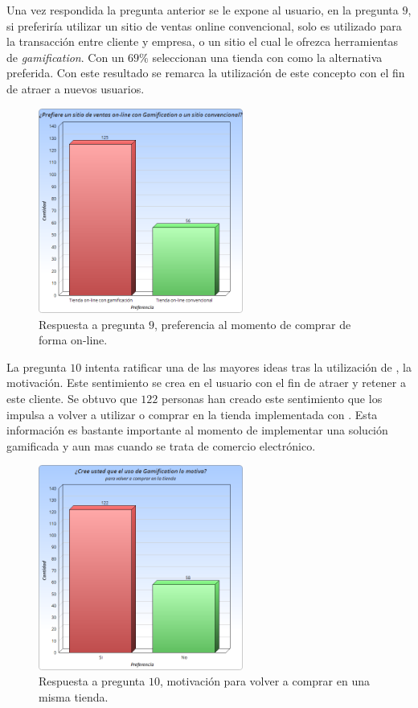 Una vez respondida la pregunta anterior se le expone al usuario, en la pregunta $9$, si preferiría
utilizar un sitio de ventas online convencional, solo es utilizado para la transacción entre cliente
y empresa, o un sitio el cual le ofrezca herramientas de \emph{gamification}. Con un $69\%$ seleccionan
una tienda con {\GAM} como la alternativa preferida. Con este resultado se remarca la
utilización de este concepto con el fin de atraer a nuevos usuarios.

\begin{figure}[!htb]
  \centering
  \includegraphics[width=0.6\textwidth]{images/Graficos/graf_5_10.png}
  \caption[chart5.10]{Respuesta a pregunta $9$, preferencia al momento de comprar de forma on-line.}
  \label{fig:chart5.10}
\end{figure}


La pregunta $10$ intenta ratificar una de las mayores ideas tras la utilización de {\GAM},
la motivación. Este sentimiento se crea en el usuario con el fin de atraer y retener a este cliente.
 Se obtuvo que $122$ personas han creado este sentimiento que los impulsa a volver a utilizar o comprar
en la tienda implementada con {\GAM}. Esta información es bastante importante al momento de implementar
una solución gamificada y aun mas cuando se trata de comercio electrónico.

\begin{figure}[!htb]
  \centering
  \includegraphics[width=0.6\textwidth]{images/Graficos/graf_5_11.png}
  \caption[chart5.11]{Respuesta a pregunta $10$, motivación para volver a comprar en una misma tienda.}
  \label{fig:chart5.11}
\end{figure}

